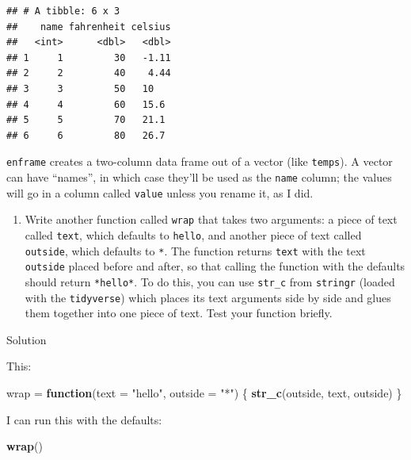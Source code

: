 \documentclass[]{tufte-book}
\newenvironment{Shaded}{}{}
\newcommand{\ControlFlowTok}[1]{\textcolor[rgb]{0.00,0.44,0.13}{\textbf{#1}}}
\newcommand{\DataTypeTok}[1]{\textcolor[rgb]{0.56,0.13,0.00}{#1}}
\newcommand{\KeywordTok}[1]{\textcolor[rgb]{0.00,0.44,0.13}{\textbf{#1}}}
\newcommand{\NormalTok}[1]{#1}
\newcommand{\StringTok}[1]{\textcolor[rgb]{0.25,0.44,0.63}{#1}}
\providecommand{\tightlist}{%
  \setlength{\itemsep}{0pt}\setlength{\parskip}{0pt}}
\theoremstyle{definition}
\theoremstyle{definition}
\theoremstyle{definition}
\theoremstyle{remark}
\begin{document}
\begin{verbatim}
## # A tibble: 6 x 3
##    name fahrenheit celsius
##   <int>      <dbl>   <dbl>
## 1     1         30   -1.11
## 2     2         40    4.44
## 3     3         50   10   
## 4     4         60   15.6 
## 5     5         70   21.1 
## 6     6         80   26.7
\end{verbatim}

\texttt{enframe} creates a two-column data frame out of a vector (like
\texttt{temps}). A vector can have ``names'', in which case they'll be
used as the \texttt{name} column; the values will go in a column called
\texttt{value} unless you rename it, as I did.

\begin{enumerate}
\def\labelenumi{(\alph{enumi})}
\setcounter{enumi}{5}
\tightlist
\item
  Write another function called \texttt{wrap} that takes two arguments:
  a piece of text called \texttt{text}, which defaults to
  \texttt{hello}, and another piece of text called \texttt{outside},
  which defaults to \texttt{*}. The function returns \texttt{text} with
  the text \texttt{outside} placed before and after, so that calling the
  function with the defaults should return \texttt{*hello*}. To do this,
  you can use \texttt{str\_c} from \texttt{stringr} (loaded with the
  \texttt{tidyverse}) which places its text arguments side by side and
  glues them together into one piece of text. Test your function
  briefly.
\end{enumerate}

Solution

This:

\begin{Shaded}
\begin{Highlighting}[]
\NormalTok{wrap =}\StringTok{ }\ControlFlowTok{function}\NormalTok{(}\DataTypeTok{text =} \StringTok{"hello"}\NormalTok{, }\DataTypeTok{outside =} \StringTok{"*"}\NormalTok{) \{}
    \KeywordTok{str_c}\NormalTok{(outside, text, outside)}
\NormalTok{\}}
\end{Highlighting}
\end{Shaded}

I can run this with the defaults:

\begin{Shaded}
\begin{Highlighting}[]
\KeywordTok{wrap}\NormalTok{()}
\end{Highlighting}
\end{Shaded}
\end{document}
